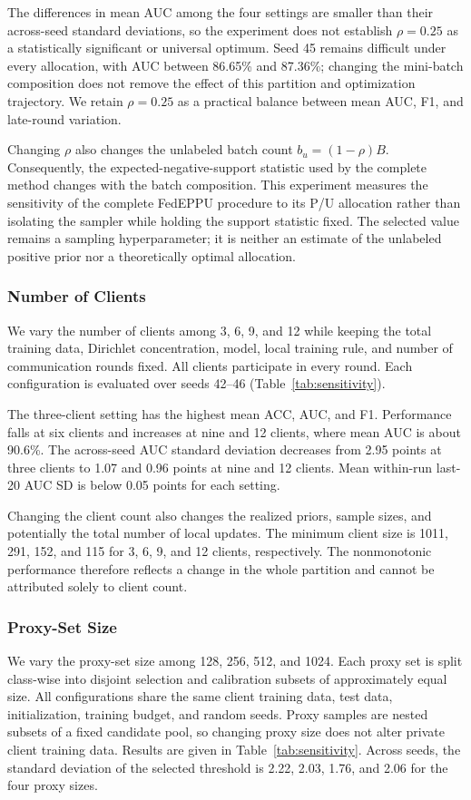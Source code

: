 \documentclass[lettersize,journal]{IEEEtran}
\begin{document}
The differences in mean AUC among the four settings are smaller than their across-seed standard deviations, so the experiment does not establish $\rho=0.25$ as a statistically significant or universal optimum. Seed 45 remains difficult under every allocation, with AUC between 86.65\% and 87.36\%; changing the mini-batch composition does not remove the effect of this partition and optimization trajectory. We retain $\rho=0.25$ as a practical balance between mean AUC, F1, and late-round variation.

Changing $\rho$ also changes the unlabeled batch count $b_u=(1-\rho)B$. Consequently, the expected-negative-support statistic used by the complete method changes with the batch composition. This experiment measures the sensitivity of the complete FedEPPU procedure to its P/U allocation rather than isolating the sampler while holding the support statistic fixed. The selected value remains a sampling hyperparameter; it is neither an estimate of the unlabeled positive prior nor a theoretically optimal allocation.

\subsubsection{Number of Clients}
We vary the number of clients among 3, 6, 9, and 12 while keeping the total training data, Dirichlet concentration, model, local training rule, and number of communication rounds fixed. All clients participate in every round. Each configuration is evaluated over seeds 42--46 (Table~\ref{tab:sensitivity}).

The three-client setting has the highest mean ACC, AUC, and F1. Performance falls at six clients and increases at nine and 12 clients, where mean AUC is about 90.6\%. The across-seed AUC standard deviation decreases from 2.95 points at three clients to 1.07 and 0.96 points at nine and 12 clients. Mean within-run last-20 AUC SD is below 0.05 points for each setting.

Changing the client count also changes the realized priors, sample sizes, and potentially the total number of local updates. The minimum client size is 1011, 291, 152, and 115 for 3, 6, 9, and 12 clients, respectively. The nonmonotonic performance therefore reflects a change in the whole partition and cannot be attributed solely to client count.

\subsubsection{Proxy-Set Size}
We vary the proxy-set size among 128, 256, 512, and 1024. Each proxy set is split class-wise into disjoint selection and calibration subsets of approximately equal size. All configurations share the same client training data, test data, initialization, training budget, and random seeds. Proxy samples are nested subsets of a fixed candidate pool, so changing proxy size does not alter private client training data. Results are given in Table~\ref{tab:sensitivity}. Across seeds, the standard deviation of the selected threshold is 2.22, 2.03, 1.76, and 2.06 for the four proxy sizes.
\end{document}
